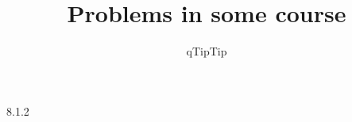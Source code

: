 \documentclass{homework}
\author{qTipTip}
\title{Problems in some course}
\begin{document}
\begin{problem}{7.32}
  \begin{problemtext}
  \blindtext 
  \end{problemtext} 
  \begin{solution}
    \blindmathtrue
    \blindtext
    \blindmathfalse
  \end{solution}
\end{problem}

\begin{problem}{8.1.2}
  \begin{problemtext}
    \blindmathtrue
    \blindtext
    \blindmathfalse
  \end{problemtext}
  \begin{solution}
    \blindtext {}
  \blindtext
  \end{solution} 
\end{problem}


\begin{problem}{3.62}
  \begin{solution}
    \blindtext 
  \end{solution}
\end{problem}
\end{document}
